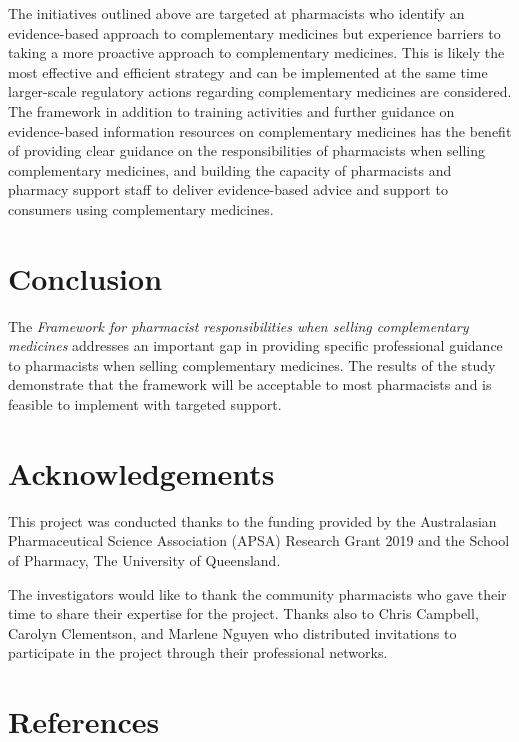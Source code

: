 \documentclass[12pt,]{article}
\begin{document}
The initiatives outlined above are targeted at pharmacists who identify
an evidence-based approach to complementary medicines but experience
barriers to taking a more proactive approach to complementary medicines.
This is likely the most effective and efficient strategy and can be
implemented at the same time larger-scale regulatory actions regarding
complementary medicines are considered. The framework in addition to
training activities and further guidance on evidence-based information
resources on complementary medicines has the benefit of providing clear
guidance on the responsibilities of pharmacists when selling
complementary medicines, and building the capacity of pharmacists and
pharmacy support staff to deliver evidence-based advice and support to
consumers using complementary medicines.

\section{Conclusion}\label{conclusion}

The \emph{Framework for pharmacist responsibilities when selling
complementary medicines} addresses an important gap in providing
specific professional guidance to pharmacists when selling complementary
medicines. The results of the study demonstrate that the framework will
be acceptable to most pharmacists and is feasible to implement with
targeted support.

\section*{Acknowledgements}\label{acknowledgements}

This project was conducted thanks to the funding provided by the
Australasian Pharmaceutical Science Association (APSA) Research Grant
2019 and the School of Pharmacy, The University of Queensland.

The investigators would like to thank the community pharmacists who gave
their time to share their expertise for the project. Thanks also to
Chris Campbell, Carolyn Clementson, and Marlene Nguyen who distributed
invitations to participate in the project through their professional
networks.

\section*{References}\label{references}
\end{document}
